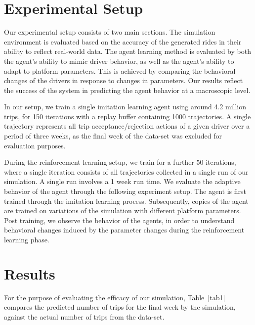 \documentclass[runningheads]{llncs}
\begin{document}
\section{Experimental Setup}

Our experimental setup consists of two main sections. The simulation environment is evaluated based on the accuracy of the generated rides in their ability to reflect real-world data. The agent learning method is evaluated by both the agent's ability to mimic driver behavior, as well as the agent's ability to adapt to platform parameters. This is achieved by comparing the behavioral changes of the drivers in response to changes in parameters. Our results reflect the success of the system in predicting the agent behavior at a macroscopic level.

In our setup, we train a single imitation learning agent using around 4.2 million trips, for 150 iterations with a replay buffer containing 1000 trajectories. A single trajectory represents all trip acceptance/rejection actions of a given driver over a period of three weeks, as the final week of the data-set was excluded for evaluation purposes.

During the reinforcement learning setup, we train for a further 50 iterations, where a single iteration consists of all trajectories collected in a single run of our simulation. A single run involves a 1 week run time. We evaluate the adaptive behavior of the agent through the following experiment setup. The agent is first trained through the imitation learning process. Subsequently, copies of the agent are trained on variations of the simulation with different platform parameters. Post training, we observe the behavior of the agents, in order to understand behavioral changes induced by the parameter changes during the reinforcement learning phase. 

\section{Results}

 For the purpose of evaluating the efficacy of our simulation, Table~\ref{tab1} compares the predicted number of trips for the final week by the simulation, against the actual number of trips from the data-set.  
\end{document}
